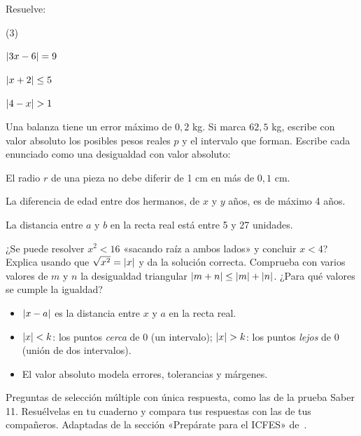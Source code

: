 \documentclass[11pt]{article}
\begin{document}
\begin{preguntas}
\pregunta Resuelve:
\begin{opciones*}(3)
  \item $\lvert3x - 6\rvert = 9$
  \item $\lvert x + 2\rvert \le 5$
  \item $\lvert4 - x\rvert > 1$
\end{opciones*}
\espacio{4cm}
\pregunta Una balanza tiene un error máximo de $0{,}2$ kg. Si marca $62{,}5$ kg,
escribe con valor absoluto los posibles pesos reales $p$ y el intervalo que forman.
\espacio{2.5cm}
\pregunta Escribe cada enunciado como una desigualdad con valor absoluto:
\begin{opciones}
  \item El radio $r$ de una pieza no debe diferir de 1 cm en más de $0{,}1$ cm.
  \item La diferencia de edad entre dos hermanos, de $x$ y $y$ años, es de máximo 4 años.
  \item La distancia entre $a$ y $b$ en la recta real está entre 5 y 27 unidades.
\end{opciones}
\espacio{2.5cm}
\pregunta ¿Se puede resolver $x^2 < 16$ «sacando raíz a ambos lados» y concluir
$x < 4$? Explica usando que $\sqrt{x^2} = \lvert x\rvert$ y da la solución correcta.
\espacio{3cm}
\pregunta Comprueba con varios valores de $m$ y $n$ la desigualdad triangular
$\lvert m + n\rvert \le \lvert m\rvert + \lvert n\rvert$. ¿Para qué valores se cumple la igualdad?
\espacio{3cm}
\end{preguntas}

\begin{resumen}
\begin{itemize}
  \item $\lvert x - a\rvert$ es la distancia entre $x$ y $a$ en la recta real.
  \item $\lvert x\rvert < k$: los puntos \emph{cerca} de 0 (un intervalo);
        $\lvert x\rvert > k$: los puntos \emph{lejos} de 0 (unión de dos intervalos).
  \item El valor absoluto modela errores, tolerancias y márgenes.
\end{itemize}
\end{resumen}


\begin{instrucciones}
Preguntas de selección múltiple con única respuesta, como las de la prueba Saber 11.
Resuélvelas en tu cuaderno y compara tus respuestas con las de tus compañeros.
Adaptadas de la sección «Prepárate para el ICFES» de~\cite{quintero}.
\end{instrucciones}
\end{document}
